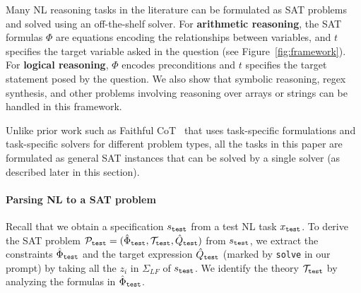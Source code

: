 \documentclass{article}
\theoremstyle{definition}
\newcommand\ttsmall[1]{\texttt{\small #1}}
\newcommand{\satprob}{\mathcal{P}}
\newcommand{\spec}{\Phi}
\newcommand{\query}{Q}
\begin{document}
Many NL reasoning tasks in the literature can be formulated as SAT problems and solved using an off-the-shelf  solver.
For \textbf{arithmetic reasoning}, the SAT formulas $\Phi$ are equations encoding the relationships between variables, and $t$ specifies the target variable asked in the question (see Figure~\ref{fig:framework}). For \textbf{logical reasoning}, $\Phi$ encodes preconditions and $t$ specifies the target statement posed by the question.
We also show that symbolic reasoning, regex synthesis, and other problems involving reasoning over arrays or strings can be handled in this framework.

Unlike prior work such as Faithful CoT~\citep{faithfulcot} that uses task-specific formulations and task-specific solvers for different problem types, all the tasks in this paper are formulated as general SAT instances that can be solved by a single solver (as described later in this section).

\paragraph{Parsing NL to a SAT problem} Recall that we obtain a specification $s_{\tt test}$ from a test NL task $x_{\tt test}$. To derive the SAT problem $\satprob_{\tt test}= (\hat{\spec}_{\tt test},\mathcal{T}_{\tt test},\hat{\query}_{\tt test})$ from $s_{\tt test}$, we extract the constraints $\hat{\spec}_{\tt test}$ and the target expression $\hat{\query}_{\tt test}$ (marked by \ttsmall{solve} in our prompt) by taking all the $z_i$ in $\Sigma_{LF}$ of $s_{\tt test}$. We identify the theory $\mathcal{T}_{\tt test}$ by analyzing the formulas in $\hat{\spec}_{\tt test}$.
\end{document}
